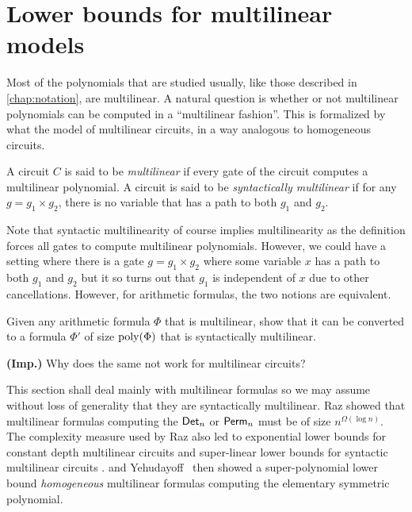\chapter{Lower bounds for multilinear models}\label{chap:multilinear}

Most of the polynomials that are studied usually, like those described in \autoref{chap:notation}, are multilinear. 
A natural question is whether or not multilinear polynomials can be computed in a ``multilinear fashion''. 
This is formalized by what the model of multilinear circuits, in a way analogous to homogeneous circuits. 

\begin{definition}
A circuit $C$ is said to be \emph{multilinear} if every gate of the circuit computes a multilinear polynomial. 
A circuit is said to be \emph{syntactically multilinear} if for any $g = g_1 \times g_2$, there is no variable that has a path to both $g_1$ and $g_2$. 
\end{definition}

Note that syntactic multilinearity of course implies multilinearity as the definition forces all gates to compute multilinear polynomials. 
However, we could have a setting where there is a gate $g = g_1 \times g_2$ where some variable $x$ has a path to both $g_1$ and $g_2$ but it so turns out that $g_1$ is independent of $x$ due to other cancellations. 
However, for arithmetic formulas, the two notions are equivalent. 

\begin{exercise}
Given any arithmetic formula $\Phi$ that is multilinear, show that it can be converted to a formula $\Phi'$ of size $\operatorname{poly}(\Phi)$ that is syntactically multilinear. 

\noindent
{\bf (Imp.)} Why does the same not work for multilinear circuits? 
\end{exercise}

This section shall deal mainly with multilinear formulas so we may assume without loss of generality that they are syntactically multilinear. 
Raz \cite{raz2004} showed that multilinear formulas computing the $\operatorname{\mathsf{Det}}_n$ or $\operatorname{\mathsf{Perm}}_n$ must be of size $n^{\Omega(\log n)}$. 
The complexity measure used by Raz also led to exponential lower bounds for constant depth multilinear circuits \cite{raz-yehudayoff} and super-linear lower bounds for syntactic multilinear circuits \cite{RSY08}. 
\Hrubes and Yehudayoff~\cite{HY11a} then showed a super-polynomial lower bound \emph{homogeneous} multilinear formulas computing the elementary symmetric polynomial.

